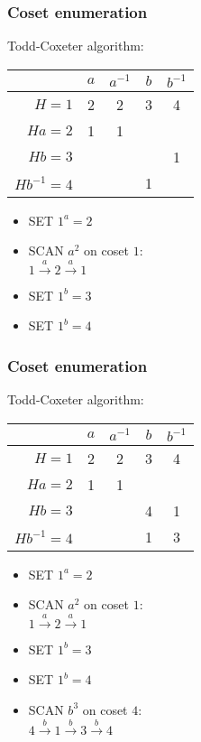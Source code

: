 \documentclass{beamer}
\begin{document}
\begin{frame}[t]
  \frametitle{Coset enumeration}
  Todd-Coxeter algorithm:
  \begin{table}
    \begin{tabular}{r | c c c c}
      & $a$ & $a^{-1}$ & $b$ & $b^{-1}$ \\ \hline
      $H=1$  & 2 & 2 & 3 & 4 \\
      $Ha=2$ & 1 & 1 &   &   \\
      $Hb=3$ &   &   &   & 1 \\
      $Hb^{-1}=4$ && & 1 &
    \end{tabular}
  \end{table}

  \begin{itemize}
  \item SET $1^a=2$  
  \item SCAN $a^2$ on coset $1$: \\ $ 1 \overset{a}{\rightarrow} 2 \overset{a}{\rightarrow} 1$
  \item SET $1^b = 3$
  \item SET $1^b = 4$
  \end{itemize}
\end{frame}

\begin{frame}[t]
  \frametitle{Coset enumeration}
  Todd-Coxeter algorithm:
  \begin{table}
    \begin{tabular}{r | c c c c}
      & $a$ & $a^{-1}$ & $b$ & $b^{-1}$ \\ \hline
      $H=1$  & 2 & 2 & 3 & 4 \\
      $Ha=2$ & 1 & 1 &   &   \\
      $Hb=3$ &   &   & 4 & 1 \\
      $Hb^{-1}=4$ && & 1 & 3
    \end{tabular}
  \end{table}

  \begin{itemize}
  \item SET $1^a=2$  
  \item SCAN $a^2$ on coset $1$: \\ $ 1 \overset{a}{\rightarrow} 2 \overset{a}{\rightarrow} 1$
  \item SET $1^b = 3$
  \item SET $1^b = 4$
  \item SCAN $b^3$ on coset $4$: \\ $ 4 \overset{b}{\rightarrow} 1 \overset{b}{\rightarrow} 3 \overset{b}{\rightarrow} 4$
  \end{itemize}
\end{frame}
\end{document}
